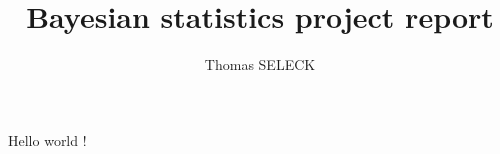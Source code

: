 \documentclass[12pt,a4paper]{report}
\author{Thomas SELECK}
\title{Bayesian statistics project report}
\begin{document}
	Hello world !
\end{document}

